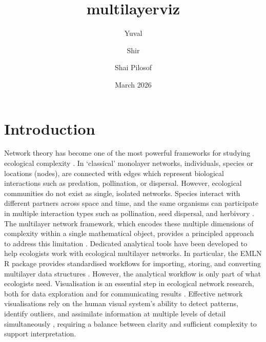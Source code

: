 \documentclass{article}
\title{multilayerviz}
\author[1]{Yuval}
\author[1]{Shir}
\author[1]{Shai Pilosof\orcidA{}}
\affil[1]{Department of Life Sciences, Ben-Gurion University of the Negev, Beer-Sheva, Israel}
\date{March 2026}
\begin{document}
\maketitle
\section{Introduction}

Network theory has become one of the most powerful frameworks for studying ecological complexity \cite{Poisot2016, Proulx2005-af}. In `classical' monolayer networks, individuals, species or locations (nodes), are connected with edges which represent biological interactions such as predation, pollination, or dispersal. However, ecological communities do not exist as single, isolated networks. Species interact with different partners across space and time, and the same organisms can participate in multiple interaction types such as pollination, seed dispersal, and herbivory \cite{Pilosof2017-gq}. The multilayer network framework, which encodes these multiple dimensions of complexity within a single mathematical object, provides a principled approach to address this limitation \cite{Kivela2014-ix, Pilosof2017-gq}. Dedicated analytical tools have been developed to help ecologists work with ecological multilayer networks. In particular, the EMLN R package provides standardised workflows for importing, storing, and converting multilayer data structures \cite{Frydman2023-qe}. However, the analytical workflow is only part of what ecologists need. Visualisation is an essential step in ecological network research, both for data exploration and for communicating results \cite{Pocock2016-jl}. Effective network visualisations rely on the human visual system's ability to detect patterns, identify outliers, and assimilate information at multiple levels of detail simultaneously \cite{Pocock2016-jl}, requiring a balance between clarity and sufficient complexity to support interpretation. 
\end{document}
